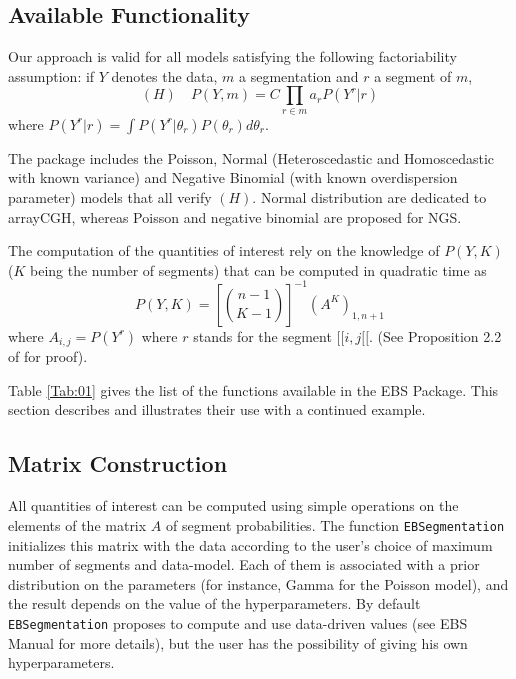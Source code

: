 \documentclass{bioinfo}
\begin{document}
\begin{methods}
\section{Available Functionality}
Our approach is valid for all models satisfying the following factoriability
assumption: if $Y$ denotes the data, $m$ a segmentation and $r$ a
segment of $m$,
\begin{equation}
 (H)\quad P(Y,m) = C \prod_{r\in m} a_r P(Y^r|r) \label{factoriability}
\end{equation}
where $P(Y^r|r) =\int P(Y^r|\theta_r)P(\theta_r)d\theta_r $.

The package includes the Poisson, Normal (Heteroscedastic and Homoscedastic with known variance) and Negative
Binomial (with known overdispersion parameter) models that all verify
$(H)$. Normal distribution are dedicated to arrayCGH, whereas Poisson and negative binomial are proposed for NGS.

The computation of the quantities of interest rely on the knowledge of $P(Y,K)$
($K$ being the number of segments) that can be computed in quadratic
time as
\begin{equation}
 P(Y,K) = \left[{n-1} \choose{K-1} \right]^{-1} \left(A^K \right)_{1,n+1} \label{Proba}
\end{equation} 
where $A_{i,j}=P(Y^r)$ where $r$ stands for the segment $[\![i,j[\![$. (See Proposition 2.2 of \cite{rigaill_exact_2011} for proof).


Table \ref{Tab:01} gives the list of the functions available in the EBS Package. This section describes and illustrates their use with a continued example. 

\subsection{Matrix Construction}

All quantities of interest can be computed using simple operations on the elements of the matrix $A$ of segment probabilities. The function \texttt{EBSegmentation} initializes this matrix with the data according to the user's choice of maximum number of segments and data-model. Each of them is associated with a prior distribution on the parameters (for instance, Gamma for the Poisson model), and the result depends on the value of the hyperparameters. By default \texttt{EBSegmentation} proposes to compute and use data-driven values (see EBS Manual for more details), but the user has the possibility of giving his own hyperparameters.


\end{methods}
\end{document}
